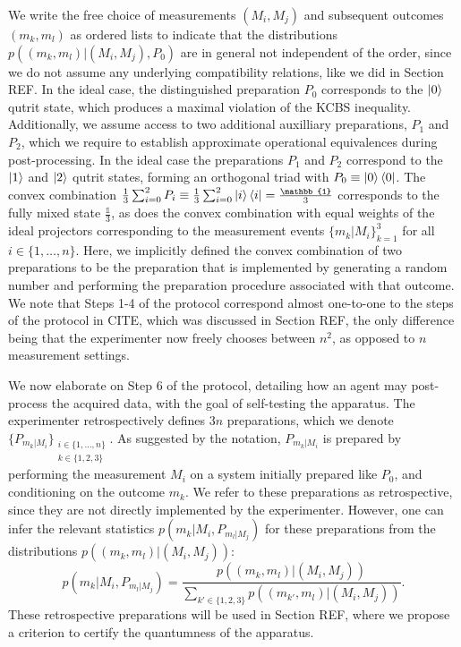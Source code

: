 We write the free choice of measurements $(M_i,M_j)$ and subsequent outcomes $(m_k,m_l)$ as ordered lists to indicate that the distributions $p((m_k,m_l)\vert (M_i,M_j),P_0)$ are in general not independent of the order, since we do not assume any underlying compatibility relations, like we did in Section REF. In the ideal case, the distinguished preparation $P_0$ corresponds to the $\ket{0}$ qutrit state, which produces a maximal violation of the KCBS inequality. Additionally, we assume access to two additional auxilliary preparations, $P_1$ and $P_2$, which we require to establish approximate operational equivalences during post-processing. In the ideal case the preparations $P_1$ and $P_2$ correspond to the $\ket{1}$ and $\ket{2}$ qutrit states, forming an orthogonal triad with $P_0\equiv\ket{0}\bra{0}$. The convex combination $\frac{1}{3}\sum_{i=0}^2 P_i\equiv\frac{1}{3}\sum_{i=0}^2\ket{i}\bra{i}=\frac{\mathbb{1}}{3}$ corresponds to the fully mixed state $\frac{\mathbb{1}}{3}$, as does the convex combination with equal weights of the ideal projectors corresponding to the measurement events $\{m_k\vert M_i\}_{k=1}^3$ for all $i\in\{1,\dots,n\}$. Here, we implicitly defined the convex combination of two preparations to be the preparation that is implemented by generating a random number and performing the preparation procedure associated with that outcome. We note that Steps 1-4 of the protocol correspond almost one-to-one to the steps of the protocol in CITE, which was discussed in Section REF, the only difference being that the experimenter now freely chooses between $n^2$, as opposed to $n$ measurement settings.

We now elaborate on Step 6 of the protocol, detailing how an agent may post-process the acquired data, with the goal of self-testing the apparatus. The experimenter retrospectively defines $3n$ preparations, which we denote $\{P_{m_k\vert M_i}\}_{\substack{i\in\{1,\dots,n\} \\ k\in\{1,2,3\}}}$. As suggested by the notation, $P_{m_k\vert M_i}$ is prepared by performing the measurement $M_i$ on a system initially prepared like $P_0$, and conditioning on the outcome $m_k$. We refer to these preparations as retrospective, since they are not directly implemented by the experimenter. However, one can infer the relevant statistics $p(m_k\vert M_i, P_{m_l\vert M_j})$ for these preparations from the distributions $p((m_k,m_l)\vert (M_i,M_j))$:
\begin{equation}
p(m_k\vert M_i, P_{m_l\vert M_j})=\frac{p((m_k,m_l)\vert (M_i,M_j))}{\sum_{k'\in\{1,2,3\}} p((m_{k'},m_l)\vert (M_i,M_j))}.
\end{equation}
These retrospective preparations will be used in Section REF, where we propose a criterion to certify the quantumness of the apparatus.

